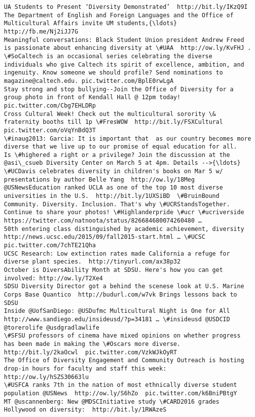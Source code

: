 \documentclass[11pt]{article}
\begin{document}
    \begin{Verbatim}[commandchars=\\\{\}]
UA Students to Present ‘Diversity Demonstrated’  http://bit.ly/IKzQ9I 
The Department of English and Foreign Languages and the Office of Multicultural Affairs invite UM students,{\ldots}  http://fb.me/Nj2iJJ7G
Meaningful conversations: Black Student Union president Andrew Freed is passionate about enhancing diversity at \#UAA  http://ow.ly/KvFHJ .
\#SoCaltech is an occasional series celebrating the diverse individuals who give Caltech its spirit of excellence, ambition, and ingenuity. Know someone we should profile? Send nominations to magazine@caltech.edu. pic.twitter.com/BplE0rwLgA
Stay strong and stop bullying--Join the Office of Diversity for a group photo in front of Kendall Hall @ 12pm today! pic.twitter.com/Cbg7EHLDRp
Cross Cultural Week! Check out the multicultural sorority \& fraternity booths till 1p \#FresWOW  http://bit.ly/FSXCultural  pic.twitter.com/oVqYnBdQ3T
\#inaug2013: Garcia: It is important that  as our country becomes more diverse that we live up to our promise of equal education for all.
Is \#highered a right or a privilege? Join the discussion at the @asi\_csueb Diversity Center on March 5 at 4pm. Details -->{\ldots}
\#UCDavis celebrates diversity in children's books on Mar 5 w/ presentations by author Belle Yang  http://ow.ly/18Meg
@USNewsEducation ranked UCLA as one of the top 10 most diverse universities in the U.S.  http://bit.ly/1UXSiBD  \#BruinBound
Community. Diversity. Inclusion. That's why \#UCRStandsTogether. Continue to share your photos! \#Highlanderpride \#ucr \#ucriverside https://twitter.com/natnoota/status/826684680074260480 …
50th entering class distinguished by academic achievement, diversity  http://news.ucsc.edu/2015/09/fall2015-start.html … \#UCSC pic.twitter.com/7chTE21Qha
UCSC Research: Low extinction rates made California a refuge for diverse plant species.  http://tinyurl.com/ax38p32 
October is DiversAbility Month at SDSU. Here's how you can get involved: http://ow.ly/T2Xe4 
SDSU Diversity Director got a behind the scenese look at U.S. Marine Corps Base Quantico  http://budurl.com/w7vk Brings lessons back to SDSU
Inside @UofSanDiego: @USDufmc Multicultural Night is One for All  http://www.sandiego.edu/insideusd/?p=34181 … \#insideusd @USDCID @torerolife @usdgradlawlife
\#SFSU professors of cinema have mixed opinions on whether progress has been made in making the \#Oscars more diverse.  http://bit.ly/2kaOcwl  pic.twitter.com/VzkWJkOyRT
The Office of Diversity Engagement and Community Outreach is hosting drop-in hours for faculty and staff this week: http://ow.ly/hSZS30663lu 
\#USFCA ranks 7th in the nation of most ethnically diverse student population @USNews  http://ow.ly/S6hZo  pic.twitter.com/k6BniPBtgY
MT @uscannenberg: New @MDSCInitiative study \#CARD2016 grades Hollywood on diversity:  http://bit.ly/1RWAzeS 

    \end{Verbatim}
\end{document}

